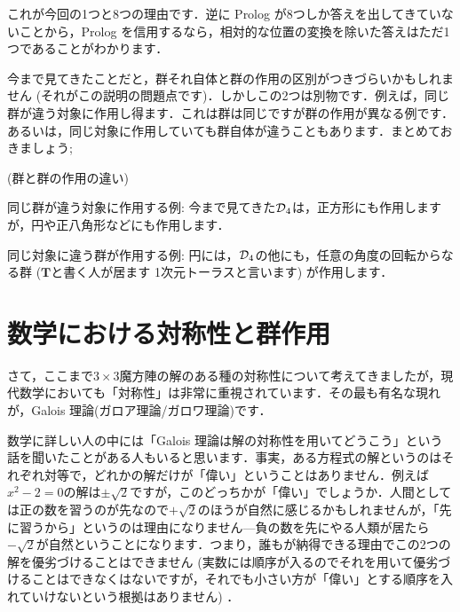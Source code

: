 \documentclass[11pt]{jsarticle}
\begin{document}
これが今回の1つと8つの理由です．逆に Prolog が8つしか答えを出してきていないことから，Prolog を信用するなら，相対的な位置の変換を除いた答えはただ1つであることがわかります．

今まで見てきたことだと，群それ自体と群の作用の区別がつきづらいかもしれません (それがこの説明の問題点です)．しかしこの2つは別物です．例えば，同じ群が違う対象に作用し得ます．これは群は同じですが群の作用が異なる例です．あるいは，同じ対象に作用していても群自体が違うこともあります．まとめておきましょう;

\begin{eg}(群と群の作用の違い)
  
  同じ群が違う対象に作用する例: 今まで見てきた$\operatorname{\mathcal{D}}_4 $は，正方形にも作用しますが，円や正八角形などにも作用します．

  同じ対象に違う群が作用する例: 円には，$\operatorname{\mathcal{D}}_4$の他にも，任意の角度の回転からなる群 ($\mathbf{T} $と書く人が居ます\cite[p. 3]{katura} 1次元トーラスと言います) が作用します．
\end{eg}

\section{数学における対称性と群作用}
さて，ここまで$3\times 3$魔方陣の解のある種の対称性について考えてきましたが，現代数学においても「対称性」は非常に重視されています．その最も有名な現れが，Galois 理論(ガロア理論/ガロワ理論)です．


数学に詳しい人の中には「Galois 理論は解の対称性を用いてどうこう」という話を聞いたことがある人もいると思います．事実，ある方程式の解というのはそれぞれ対等で，どれかの解だけが「偉い」ということはありません．例えば$x^2-2=0$の解は$\pm \sqrt{2} $ですが，このどっちかが「偉い」でしょうか．人間としては正の数を習うのが先なので${+\sqrt{2}}$のほうが自然に感じるかもしれませんが，「先に習うから」というのは理由になりません---負の数を先にやる人類が居たら${-\sqrt{2}}$が自然ということになります．つまり，誰もが納得できる理由でこの2つの解を優劣づけることはできません (実数には順序が入るのでそれを用いて優劣づけることはできなくはないですが，それでも小さい方が「偉い」とする順序を入れていけないという根拠はありません) ．
\end{document}
